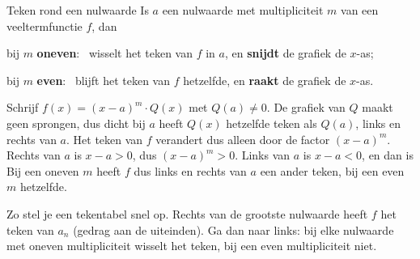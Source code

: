 \begin{theorie}
\begin{stelling}{Teken rond een nulwaarde}
Is $a$ een nulwaarde met multipliciteit $m$ van een veeltermfunctie $f$, dan

\qquad bij $m$ \textbf{\textcolor{accent}{oneven}}: \ wisselt het teken van $f$ in $a$, en \textbf{\textcolor{accent}{snijdt}} de grafiek de $x$-as;

\qquad bij $m$ \textbf{\textcolor{accent}{even}}: \ blijft het teken van $f$ hetzelfde, en \textbf{\textcolor{accent}{raakt}} de grafiek de $x$-as.
\end{stelling}

\begin{bewijs}
Schrijf $f(x) = (x - a)^m \cdot Q(x)$ met $Q(a) \neq 0$. De grafiek van $Q$ maakt geen sprongen, dus dicht bij $a$ heeft $Q(x)$ hetzelfde teken als $Q(a)$, links en rechts van $a$. Het teken van $f$ verandert dus alleen door de factor $(x - a)^m$. Rechts van $a$ is $x - a > 0$, dus $(x - a)^m > 0$. Links van $a$ is $x - a < 0$, en dan is
Bij een oneven $m$ heeft $f$ dus links en rechts van $a$ een ander teken, bij een even $m$ hetzelfde.
\end{bewijs}
\end{theorie}

Zo stel je een tekentabel snel op. Rechts van de grootste nulwaarde heeft $f$ het teken van $a_n$ (gedrag aan de uiteinden). Ga dan naar links: bij elke nulwaarde met oneven multipliciteit wisselt het teken, bij een even multipliciteit niet.



